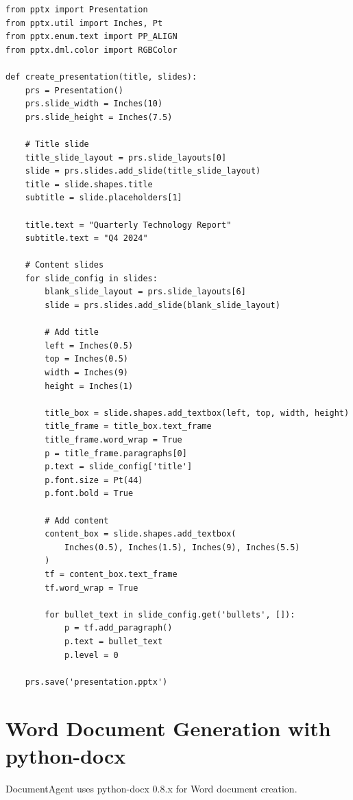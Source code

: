 \documentclass{report}
\begin{document}
\begin{lstlisting}
from pptx import Presentation
from pptx.util import Inches, Pt
from pptx.enum.text import PP_ALIGN
from pptx.dml.color import RGBColor

def create_presentation(title, slides):
    prs = Presentation()
    prs.slide_width = Inches(10)
    prs.slide_height = Inches(7.5)
    
    # Title slide
    title_slide_layout = prs.slide_layouts[0]
    slide = prs.slides.add_slide(title_slide_layout)
    title = slide.shapes.title
    subtitle = slide.placeholders[1]
    
    title.text = "Quarterly Technology Report"
    subtitle.text = "Q4 2024"
    
    # Content slides
    for slide_config in slides:
        blank_slide_layout = prs.slide_layouts[6]
        slide = prs.slides.add_slide(blank_slide_layout)
        
        # Add title
        left = Inches(0.5)
        top = Inches(0.5)
        width = Inches(9)
        height = Inches(1)
        
        title_box = slide.shapes.add_textbox(left, top, width, height)
        title_frame = title_box.text_frame
        title_frame.word_wrap = True
        p = title_frame.paragraphs[0]
        p.text = slide_config['title']
        p.font.size = Pt(44)
        p.font.bold = True
        
        # Add content
        content_box = slide.shapes.add_textbox(
            Inches(0.5), Inches(1.5), Inches(9), Inches(5.5)
        )
        tf = content_box.text_frame
        tf.word_wrap = True
        
        for bullet_text in slide_config.get('bullets', []):
            p = tf.add_paragraph()
            p.text = bullet_text
            p.level = 0
    
    prs.save('presentation.pptx')
\end{lstlisting}

\section{Word Document Generation with python-docx}

DocumentAgent uses python-docx 0.8.x for Word document creation.
\end{document}
